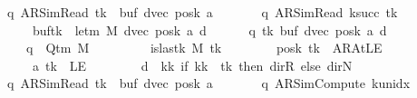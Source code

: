\begin{isabellebody}
{}\isanewline
\ \ \ \ {\isacharbraceleft}{\kern0pt}{\isacharparenleft}{\kern0pt}{\isacharparenleft}{\kern0pt}q{\isacharcomma}{\kern0pt}\ AR{\isacharunderscore}{\kern0pt}SimRead{\isacharcomma}{\kern0pt}\ tk{\isacharcomma}{\kern0pt}\ {}{\isacharcomma}{\kern0pt}\ buf{\isacharcomma}{\kern0pt}\ dvec{\isacharcomma}{\kern0pt}\ posk{\isacharparenright}{\kern0pt}{\isacharcomma}{\kern0pt}\ a{\isacharcomma}{\kern0pt}\isanewline
\ \ \ \ \ \ \ {\isacharparenleft}{\kern0pt}q{\isacharcomma}{\kern0pt}\ AR{\isacharunderscore}{\kern0pt}SimRead{\isacharcomma}{\kern0pt}\ k{\isacharunderscore}{\kern0pt}succ\ tk{\isacharcomma}{\kern0pt}\ {}{\isacharcomma}{\kern0pt}\isanewline
\ \ \ \ \ \ \ \ buf{\isacharparenleft}{\kern0pt}tk\ {\isacharcolon}{\kern0pt}{\isacharequal}{\kern0pt}\ le{\isacharunderscore}{\kern0pt}tm\ M{\isacharparenright}{\kern0pt}{\isacharcomma}{\kern0pt}\ dvec{\isacharcomma}{\kern0pt}\ posk{\isacharparenright}{\kern0pt}{\isacharcomma}{\kern0pt}\ a{\isacharcomma}{\kern0pt}\ d{\isacharparenright}{\kern0pt}\ {\isacharbar}{\kern0pt}\isanewline
\ \ \ \ \ q\ tk\ buf\ dvec\ posk\ a\ d{\isachardot}{\kern0pt}\isanewline
\ \ \ \ \ \ \ q\ {\isasymin}\ Q{\isacharunderscore}{\kern0pt}tm\ M\isanewline
\ \ \ \ \ \ \ {\isasymand}\ {\isasymnot}\ is{\isacharunderscore}{\kern0pt}last{\isacharunderscore}{\kern0pt}k\ M\ tk\isanewline
\ \ \ \ \ \ \ {\isasymand}\ posk\ tk\ {\isacharequal}{\kern0pt}\ AR{\isacharunderscore}{\kern0pt}AtLE\isanewline
\ \ \ \ \ \ \ {\isasymand}\ a\ tk\ {\isacharequal}{\kern0pt}\ LE{}\isanewline
\ \ \ \ \ \ \ {\isasymand}\ d\ {\isacharequal}{\kern0pt}\ {\isacharparenleft}{\kern0pt}{\isasymlambda}kk{\isachardot}{\kern0pt}\ if\ kk\ {\isacharequal}{\kern0pt}\ tk\ then\ dir{\isachardot}{\kern0pt}R\ else\ dir{\isachardot}{\kern0pt}N{\isacharparenright}{\kern0pt}{\isacharbraceright}{\kern0pt}\isanewline
\ \ \ \ {\isasymunion}\isanewline
\ \ \ \ %
\isanewline
\ \ \ \ {\isacharbraceleft}{\kern0pt}{\isacharparenleft}{\kern0pt}{\isacharparenleft}{\kern0pt}q{\isacharcomma}{\kern0pt}\ AR{\isacharunderscore}{\kern0pt}SimRead{\isacharcomma}{\kern0pt}\ tk{\isacharcomma}{\kern0pt}\ {}{\isacharcomma}{\kern0pt}\ buf{\isacharcomma}{\kern0pt}\ dvec{\isacharcomma}{\kern0pt}\ posk{\isacharparenright}{\kern0pt}{\isacharcomma}{\kern0pt}\ a{\isacharcomma}{\kern0pt}\isanewline
\ \ \ \ \ \ \ {\isacharparenleft}{\kern0pt}q{\isacharcomma}{\kern0pt}\ AR{\isacharunderscore}{\kern0pt}SimCompute{\isacharcomma}{\kern0pt}\ k{\isacharunderscore}{\kern0pt}unidx\ {}{\isacharcomma}{\kern0pt}\ {}{\isacharcomma}{\kern0pt}\isanewline

\end{isabellebody}
